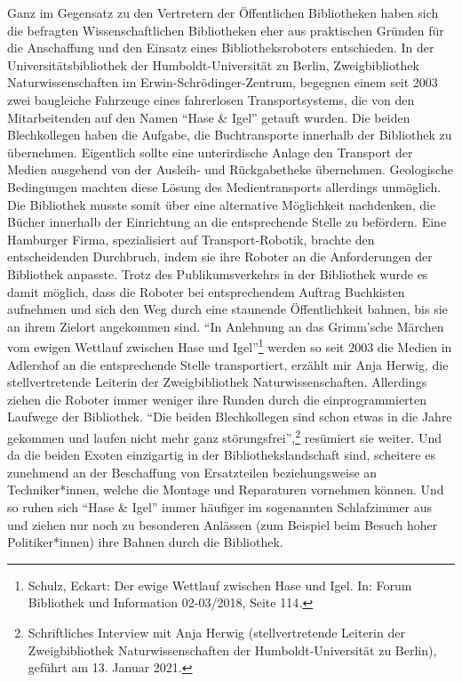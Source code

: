\documentclass[a4paper,
fontsize=11pt,
oneside,
numbers=noperiodatend,
parskip=half-,
bibliography=totoc,
final
]{scrartcl}
\begin{document}
Ganz im Gegensatz zu den Vertretern der Öffentlichen Bibliotheken haben
sich die befragten Wissenschaftlichen Bibliotheken eher aus praktischen
Gründen für die Anschaffung und den Einsatz eines Bibliotheksroboters
entschieden. In der Universitätsbibliothek der Humboldt-Universität zu
Berlin, Zweigbibliothek Naturwissenschaften im
Erwin-Schrödinger-Zentrum, begegnen einem seit 2003 zwei baugleiche
Fahrzeuge eines fahrerlosen Transportsystems, die von den Mitarbeitenden
auf den Namen \enquote{Hase \& Igel} getauft wurden. Die beiden
Blechkollegen haben die Aufgabe, die Buchtransporte innerhalb der
Bibliothek zu übernehmen. Eigentlich sollte eine unterirdische Anlage
den Transport der Medien ausgehend von der Ausleih- und Rückgabetheke
übernehmen. Geologische Bedingungen machten diese Lösung des
Medientransports allerdings unmöglich. Die Bibliothek musste somit über
eine alternative Möglichkeit nachdenken, die Bücher innerhalb der
Einrichtung an die entsprechende Stelle zu befördern. Eine Hamburger
Firma, spezialisiert auf Transport-Robotik, brachte den entscheidenden
Durchbruch, indem sie ihre Roboter an die Anforderungen der Bibliothek
anpasste. Trotz des Publikumsverkehrs in der Bibliothek wurde es damit
möglich, dass die Roboter bei entsprechendem Auftrag Buchkisten
aufnehmen und sich den Weg durch eine staunende Öffentlichkeit bahnen,
bis sie an ihrem Zielort angekommen sind. \enquote{In Anlehnung an das
Grimm'sche Märchen vom ewigen Wettlauf zwischen Hase und
Igel}\footnote{Schulz, Eckart: Der ewige Wettlauf zwischen Hase und Igel.
  In: Forum Bibliothek und Information 02-03/2018, Seite 114\emph{.}}
werden so seit 2003 die Medien in Adlershof an die entsprechende Stelle
transportiert, erzählt mir Anja Herwig, die stellvertretende Leiterin
der Zweigbibliothek Naturwissenschaften. Allerdings ziehen die Roboter
immer weniger ihre Runden durch die einprogrammierten Laufwege der
Bibliothek. \enquote{Die beiden Blechkollegen sind schon etwas in die
Jahre gekommen und laufen nicht mehr ganz störungsfrei},\footnote{Schriftliches
  Interview mit Anja Herwig (stellvertretende Leiterin der
  Zweigbibliothek Naturwissenschaften der Humboldt-Universität zu
  Berlin), geführt am 13. Januar 2021.} resümiert sie weiter. Und da
die beiden Exoten einzigartig in der Bibliothekslandschaft sind,
scheitere es zunehmend an der Beschaffung von Ersatzteilen
beziehungsweise an Techniker*innen, welche die Montage und Reparaturen
vornehmen können. Und so ruhen sich \enquote{Hase \& Igel} immer
häufiger im sogenannten Schlafzimmer aus und ziehen nur noch zu
besonderen Anlässen (zum Beispiel beim Besuch hoher Politiker*innen)
ihre Bahnen durch die Bibliothek.
\end{document}
